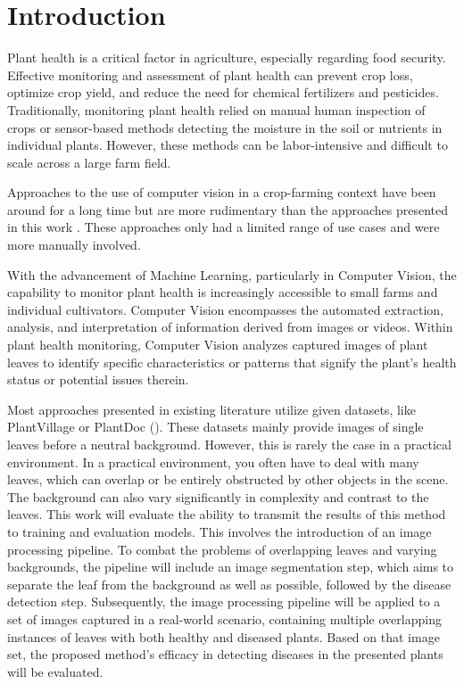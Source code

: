 \documentclass[draft,final]{vutinfth} %
\begin{document}

\tableofcontents %

\mainmatter

\chapter{Introduction}
Plant health is a critical factor in agriculture, especially regarding food security. Effective monitoring and assessment of plant health can prevent crop loss, optimize crop yield, and reduce the need for chemical fertilizers and pesticides. Traditionally, monitoring plant health relied on manual human inspection of crops or sensor-based methods detecting the moisture in the soil or nutrients in individual plants. However, these methods can be labor-intensive and difficult to scale across a large farm field.

Approaches to the use of computer vision in a crop-farming context have been around for a long time but are more rudimentary than the approaches presented in this work \cite{cunha_application_2003}. These approaches only had a limited range of use cases and were more manually involved. 

With the advancement of Machine Learning, particularly in Computer Vision, the capability to monitor plant health is increasingly accessible to small farms and individual cultivators. Computer Vision encompasses the automated extraction, analysis, and interpretation of information derived from images or videos. Within plant health monitoring, Computer Vision analyzes captured images of plant leaves to identify specific characteristics or patterns that signify the plant's health status or potential issues therein.

Most approaches presented in existing literature utilize given datasets, like PlantVillage or PlantDoc (\cite{hughes_open_2016, singh_plantdoc_2020}). These datasets mainly provide images of single leaves before a neutral background. However, this is rarely the case in a practical environment. 
In a practical environment, you often have to deal with many leaves, which can overlap or be entirely obstructed by other objects in the scene. The background can also vary significantly in complexity and contrast to the leaves. 
This work will evaluate the ability to transmit the results of this method to training and evaluation models. This involves the introduction of an image processing pipeline. To combat the problems of overlapping leaves and varying backgrounds, the pipeline will include an image segmentation step, which aims to separate the leaf from the background as well as possible, followed by the disease detection step. 
Subsequently, the image processing pipeline will be applied to a set of images captured in a real-world scenario, containing multiple overlapping instances of leaves with both healthy and diseased plants. Based on that image set, the proposed method's efficacy in detecting diseases in the presented plants will be evaluated.
\end{document}
